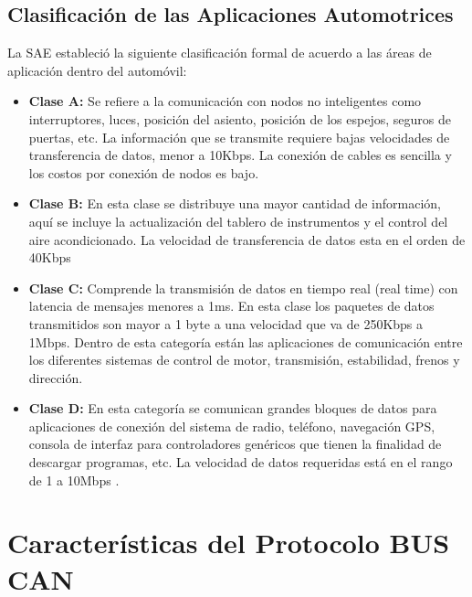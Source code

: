 \subsection {Clasificación de las Aplicaciones Automotrices}
La SAE estableció la siguiente clasificación formal de acuerdo a las áreas de aplicación dentro del automóvil:
\begin {itemize} 

\item \textbf{Clase A:} Se refiere a la comunicación con nodos no inteligentes como interruptores, luces, posición del asiento, posición de los espejos, seguros de puertas, etc. La información que se transmite requiere bajas velocidades de transferencia de datos, menor a 10Kbps. La conexión de cables es sencilla y los costos por conexión de nodos es bajo.

\item \textbf {Clase B:} En esta clase se distribuye una mayor cantidad de información, aquí se incluye la actualización del tablero de instrumentos y el control del aire acondicionado. La velocidad de transferencia de datos esta en el orden de 40Kbps

\item \textbf{Clase C:} Comprende la transmisión de datos en tiempo real (real time) con latencia de mensajes menores a 1ms. En esta clase los paquetes de datos transmitidos son mayor a 1 byte a una velocidad que va de 250Kbps a 1Mbps. Dentro de esta categoría están las aplicaciones de comunicación entre los diferentes sistemas de control  de motor, transmisión, estabilidad, frenos y dirección.

\item \textbf{Clase D:} En esta categoría se comunican grandes bloques de datos para aplicaciones de conexión del sistema de radio, teléfono, navegación GPS, consola de interfaz para controladores genéricos que tienen la finalidad de descargar programas, etc. La velocidad de datos requeridas está en el rango de 1 a 10Mbps \cite{DSEEPC}.
\end{itemize}

\section {Características del Protocolo BUS CAN}


